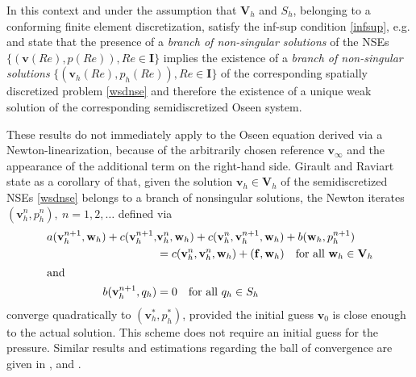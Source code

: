 \documentclass[a4paper,10pt,BCOR=15mm]{scrbook}
\begin{document}
In this context and under the assumption that $\mathbf V_h$ and $S_h$, belonging to a conforming finite element discretization, satisfy the inf-sup condition \eqref{infsup}, e.g. \cite[Thm. 7.2]{elma} and \cite[Thm. 4.1]{gira} state that the presence of a\textit{ branch of non-singular solutions} of the NSEs $\{ (\mathbf v(Re),p(Re)), Re \in \mathbf I\}$ implies the existence of a \textit{branch of non-singular solutions} $\{ (\mathbf v_h(Re),p_h(Re)),Re \in \mathbf  I\}$ of the corresponding spatially discretized problem \eqref{wsdnse} and therefore the existence of a unique weak solution of the corresponding semidiscretized Oseen system.

These results do not immediately apply to the Oseen equation derived via a Newton-linearization, because of the arbitrarily chosen reference $\mathbf v_\infty$ and the appearance of the additional term on the right-hand side. Girault and Raviart state as a corollary of \cite[Thm. 6.3]{gira2} that, given the solution $\mathbf v_h \in \mathbf V_h$ of the semidiscretized NSEs \eqref{wsdnse} belongs to a branch of nonsingular solutions, the Newton iterates $(\mathbf v_h^n,p_h^n),~n=1,2,\dots$ defined via
\begin{subequations}\label{wsnewt}
\begin{align}
 a(\mathbf v_h^{n+1}, \mathbf w_h) + c(\mathbf v_h^{n+1},& \mathbf v_h^n, \mathbf w_h)+c(\mathbf v_h^n,\mathbf v_h^{n+1}, \mathbf w_h)+ b(\mathbf w_h, p_h^{n+1}) \notag \\
&=c(\mathbf v_h^n,\mathbf v_h^n, \mathbf w_h)+(\mathbf f, \mathbf w_h) \quad \text{for all } \mathbf w_h \in \mathbf V_h \\
\intertext{and} 
 b(\mathbf v_h^{n+1}, q_h) &= 0 \quad \text{for all } q_h \in S_h
\end{align}
\end{subequations}
converge quadratically to $(\mathbf v^*_h,p^*_h)$, provided the initial guess $\mathbf v_0$ is close enough to the actual solution. This scheme does not require an initial guess for the pressure. Similar results and estimations regarding the ball of convergence are given in \cite[p. 86]{gunz}, \cite[Prop. 3.5]{gupe} and \cite[Thm. 4.1]{kara}.
\end{document}

